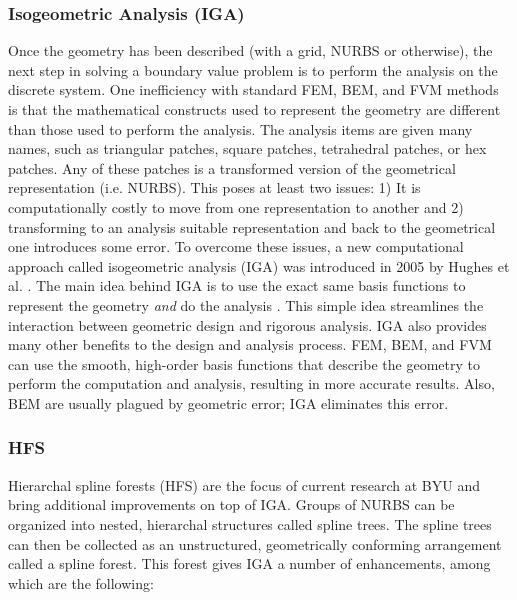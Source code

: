     \subsubsection{Isogeometric Analysis (IGA)} \label{ssub:isogeometric_analysis_iga}

      Once the geometry has been described (with a grid, NURBS or otherwise), the next step in solving a boundary value problem is to perform the analysis on the discrete system. One inefficiency with standard FEM, BEM, and FVM methods is that the mathematical constructs used to represent the geometry are different than those used to perform the analysis. The analysis items are given many names, such as triangular patches, square patches, tetrahedral patches, or hex patches. Any of these patches is a transformed version of the geometrical representation (i.e. NURBS). This poses at least two issues: 1) It is computationally costly to move from one representation to another and 2) transforming to an analysis suitable representation and back to the geometrical one introduces some error.
      To overcome these issues, a new computational approach called isogeometric analysis (IGA) was introduced in 2005 by Hughes et al. \cite{hughes2005}. The main idea behind IGA is to use the exact same basis functions to represent the geometry \textit{and} do the analysis \cite{scott2013}. This simple idea streamlines the interaction between geometric design and rigorous analysis. IGA also provides many other benefits to the design and analysis process. FEM, BEM, and FVM  can use the smooth, high-order basis functions that describe the geometry to perform the computation and analysis, resulting in more accurate results. Also, BEM are usually plagued by geometric error; IGA eliminates this error. 

      \subsubsection{HFS} \label{ssub:hsfpy}

        Hierarchal spline forests (HFS) are the focus of current research at BYU and bring additional improvements on top of IGA. Groups of NURBS can be organized into nested, hierarchal structures called spline trees.  The spline trees can then be collected as an unstructured, geometrically conforming arrangement called a spline forest. This forest gives IGA a number of enhancements, among which are the following:

